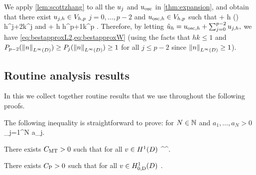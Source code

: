 
We apply \cref{lem:scottzhang} to all the $u_{j}$ and $u_{\mathrm{osc}}$ in \cref{thm:expansion}, and obtain that there exist $u_{j,h} \in V_{h,p}$ $j=0,\ldots,p-2$ and $u_{\mathrm{osc},h} \in V_{h,p}$ such that 
\beqs
\NLtD{\usj - \ujh} + h\NHoD{\usj - \ujh} \leq {}  \Pj\mleft(\mright) h^{j+2}k^j \Cfg
\eeqs
and
\beqs
\NLtD{\uosc - \uosch} + h\NHoD{\uosc - \uosch} \leq {} \Cosc\CAnk h^{p+1}k^p \Cfg.
\eeqs
Therefore, by letting $\hat{u}_{h} = u_{\mathrm{osc},h} + \sum_{j=0}^{p-2} u_{j,h},$ we have \cref{eq:bestapproxL2,eq:bestapproxW} (using the facts that $hk \leq 1$ and $\Pfn{p-2}(\NLiD{n}) \geq \Pfn{j}(\NLiD{n}) \geq 1$ for all $j \leq p-2$ since $\NLiD{n} \geq 1$).
\epf

\subsection{Routine analysis results}\label{sec:anbackground}
In this  we collect together routine results that we use throughout the following proofs.

The following inequality is straightforward to prove: for $N \in \mathbb N$ and $a_1,\ldots,a_N > 0$
\beq\label{eq:simple}
 \leq \sum_{j=1}^N a_j.
\eeq



\label{thm:multiplicativetrace}%
There exists $C_{\mathrm{MT}} > 0$ such that for all $v \in \HoD$
\beqs
{} \leq \CMT {}^\half {}^\half.
\eeqs
\enth

\label{lem:poincare}
There exists $C_{\mathrm{P}} > 0$ such that for all $v \in \HozDD$
\beqs
{} \leq \CP {}.
\eeqs
\ele

